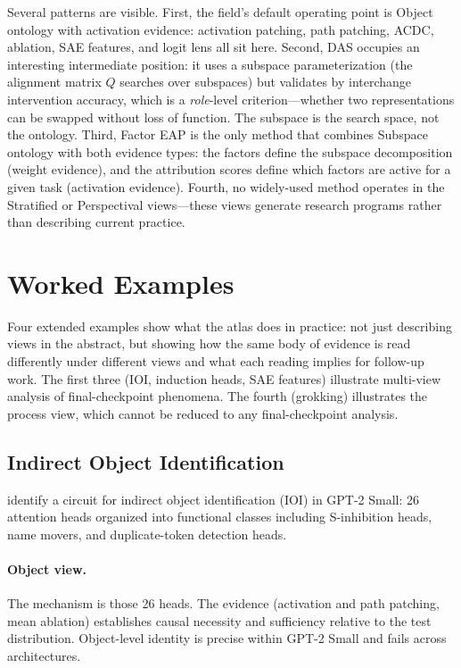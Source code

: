 \documentclass[11pt]{article}
\theoremstyle{remark}
\begin{document}
Several patterns are visible.  First, the field's default operating point
is Object ontology with activation evidence: activation patching, path
patching, ACDC, ablation, SAE features, and logit lens all sit here.
Second, DAS occupies an interesting intermediate position: it uses a
subspace parameterization (the alignment matrix $Q$ searches over
subspaces) but validates by interchange intervention accuracy, which is a
\emph{role}-level criterion---whether two representations can be swapped
without loss of function.  The subspace is the search space, not the
ontology.  Third, Factor EAP is the only method
that combines Subspace ontology with both evidence types: the factors
define the subspace decomposition (weight evidence), and the attribution
scores define which factors are active for a given task (activation
evidence).  Fourth, no widely-used method operates in the Stratified or
Perspectival views---these views generate research programs rather than
describing current practice.

\section{Worked Examples}\label{sec:examples}

Four extended examples show what the atlas does in practice: not just
describing views in the abstract, but showing how the same body of
evidence is read differently under different views and what each reading
implies for follow-up work.  The first three (IOI, induction heads, SAE
features) illustrate multi-view analysis of final-checkpoint phenomena.
The fourth (grokking) illustrates the process view, which cannot be
reduced to any final-checkpoint analysis.

\subsection{Indirect Object Identification}

\citet{wang2022} identify a circuit for indirect object identification
(IOI) in GPT-2 Small: 26 attention heads organized into functional
classes including S-inhibition heads, name movers, and
duplicate-token detection heads.

\paragraph{Object view.}
The mechanism is those 26 heads.  The evidence (activation and path
patching, mean ablation) establishes causal necessity and sufficiency
relative to the test distribution.  Object-level identity is precise
within GPT-2 Small and fails across architectures.
\end{document}

